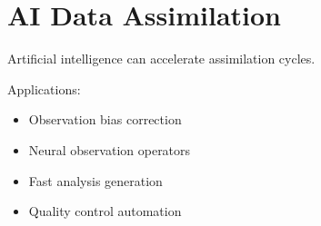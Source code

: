 \section{AI Data Assimilation}


Artificial intelligence can accelerate assimilation cycles.



Applications:


\begin{itemize}

\item Observation bias correction

\item Neural observation operators

\item Fast analysis generation

\item Quality control automation

\end{itemize}
